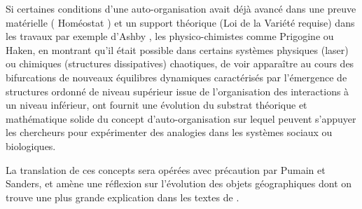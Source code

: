 Si certaines conditions d'une auto-organisation avait déjà avancé dans une preuve matérielle ( Homéostat ) et un support théorique (Loi de la Variété requise) dans les travaux par exemple d'Ashby \autocite[800-801]{Pouvreau2013}, les physico-chimistes comme Prigogine ou Haken, en montrant qu'il était possible dans certains systèmes physiques (laser) ou chimiques (structures dissipatives) chaotiques, de voir apparaître au cours des bifurcations de nouveaux équilibres dynamiques caractérisés par l'émergence de structures ordonné de niveau supérieur issue de l'organisation des interactions à un niveau inférieur, ont fournit une évolution du substrat théorique et mathématique solide du concept d'auto-organisation sur lequel peuvent s'appuyer les chercheurs pour expérimenter des analogies dans les systèmes sociaux ou biologiques.




La translation de ces concepts sera opérées avec précaution par Pumain et Sanders, et amène une réflexion sur l'évolution des objets géographiques dont on trouve une plus grande explication dans les textes de \textcite{Pumain1982b, Pumain1989}.





